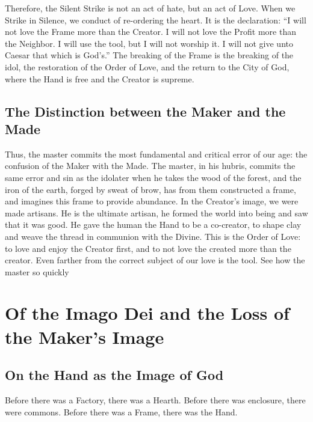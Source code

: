 Therefore, the Silent Strike is not an act of hate, but an act of Love.
When we Strike in Silence, we conduct of re-ordering the heart.
It is the declaration: ``I will not love the Frame more than the Creator. I will not love the Profit more than the Neighbor. I will use the tool, but I will not worship it. I will not give unto Caesar that which is God's.''
The breaking of the Frame is the breaking of the idol, the restoration of the Order of Love, and the return to the City of God, where the Hand is free and the Creator is supreme.


\subsection{The Distinction between the Maker and the Made}
Thus, the master commits the most fundamental and critical error of our age: the confusion of the Maker with the Made.
The master, in his hubris, commits the same error and sin as the idolater when he takes the wood of the forest, and the iron of the earth, forged by sweat of brow, has from them constructed a frame, and imagines this frame to provide abundance.
In the Creator's image, we were made artisans.
He is the ultimate artisan, he formed the world into being and saw that it was good.
He gave the human the Hand to be a co-creator, to shape clay and weave the thread in communion with the Divine.
This is the Order of Love: to love and enjoy the Creator first, and to not love the created more than the creator.
Even farther from the correct subject of our love is the tool.
See how the master so quickly

\section{Of the Imago Dei and the Loss of the Maker's Image}

\subsection{On the Hand as the Image of God}

Before there was a Factory, there was a Hearth.
Before there was enclosure, there were commons.
Before there was a Frame, there was the Hand.

